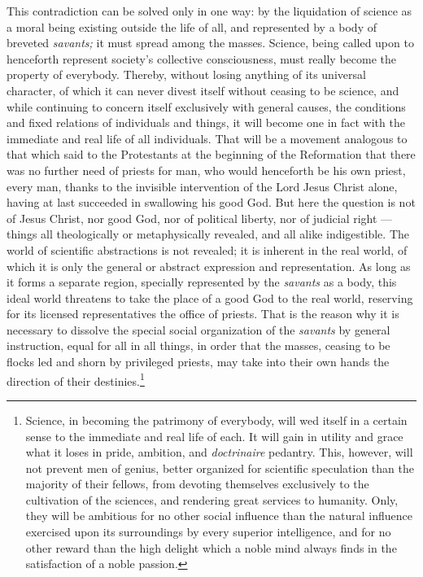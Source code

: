 \documentclass[12pt]{report}
\begin{document}
This contradiction can be solved only in one way: by the liquidation of science as a moral being existing outside the life of all, and represented by a body of breveted \emph{savants;} it must spread among the masses. Science, being called upon to henceforth represent society’s collective consciousness, must really become the property of everybody. Thereby, without losing anything of its universal character, of which it can never divest itself without ceasing to be science, and while continuing to concern itself exclusively with general causes, the conditions and fixed relations of individuals and things, it will become one in fact with the immediate and real life of all individuals. That will be a movement analogous to that which said to the Protestants at the beginning of the Reformation that there was no further need of priests for man, who would henceforth be his own priest, every man, thanks to the invisible intervention of the Lord Jesus Christ alone, having at last succeeded in swallowing his good God. But here the question is not of Jesus Christ, nor good God, nor of political liberty, nor of judicial right — things all theologically or metaphysically revealed, and all alike indigestible. The world of scientific abstractions is not revealed; it is inherent in the real world, of which it is only the general or abstract expression and representation. As long as it forms a separate region, specially represented by the \emph{savants} as a body, this ideal world threatens to take the place of a good God to the real world, reserving for its licensed representatives the office of priests. That is the reason why it is necessary to dissolve the special social organization of the \emph{savants} by general instruction, equal for all in all things, in order that the masses, ceasing to be flocks led and shorn by privileged priests, may take into their own hands the direction of their destinies.\footnote{Science, in becoming the patrimony of everybody, will wed itself in a certain sense to the immediate and real life of each. It will gain in utility and grace what it loses in pride, ambition, and \emph{doctrinaire} pedantry. This, however, will not prevent men of genius, better organized for scientific speculation than the majority of their fellows, from devoting themselves exclusively to the cultivation of the sciences, and rendering great services to humanity. Only, they will be ambitious for no other social influence than the natural influence exercised upon its surroundings by every superior intelligence, and for no other reward than the high delight which a noble mind always finds in the satisfaction of a noble passion.}
\end{document}
